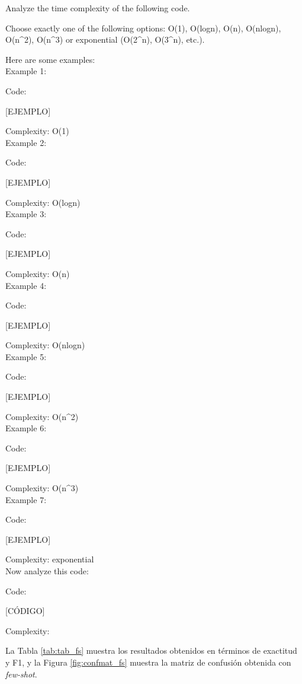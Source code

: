 \documentclass[12pt,twoside]{article}
\begin{document}
\begin{tcolorbox}[
  colback=gray!5,
  colframe=black,
  boxrule=0.5pt,
  breakable,
  title=Prompt few-shot,
]
Analyze the time complexity of the following code.

Choose exactly one of the following options: O(1), O(logn), O(n), O(nlogn), O(n\textasciicircum2), O(n\textasciicircum3) or exponential (O(2\textasciicircum n), O(3\textasciicircum n), etc.).

Here are some examples:
\\[\baselineskip]
Example 1:

Code:

[EJEMPLO]

Complexity: O(1)
\\[\baselineskip]
Example 2:

Code:

[EJEMPLO]

Complexity: O(logn)
\\[\baselineskip]
Example 3:

Code:

[EJEMPLO]

Complexity: O(n)
\\[\baselineskip]
Example 4:

Code:

[EJEMPLO]

Complexity: O(nlogn)
\\[\baselineskip]
Example 5:

Code:

[EJEMPLO]

Complexity: O(n\textasciicircum2)
\\[\baselineskip]
Example 6:

Code:

[EJEMPLO]

Complexity: O(n\textasciicircum3)
\\[\baselineskip]
Example 7:

Code:

[EJEMPLO]

Complexity: exponential
\\[\baselineskip]
Now analyze this code:

Code:

[CÓDIGO]

Complexity:
\end{tcolorbox}

La Tabla \ref{tab:tab_fs} muestra los resultados obtenidos en términos de exactitud y F1, y la Figura \ref{fig:confmat_fs} muestra la matriz de confusión obtenida con \textit{few-shot}.
\end{document}
